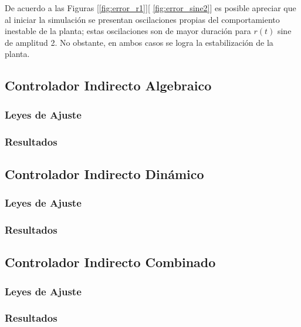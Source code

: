 De acuerdo a las Figuras [\ref{fig:error_r1}][ \ref{fig:error_sine2}] es posible apreciar que al iniciar la simulación se presentan oscilaciones propias del comportamiento inestable de la planta; estas oscilaciones son de mayor duración para $r(t)$ sine de amplitud 2. No obstante, en ambos casos se logra la estabilización de la planta.














\subsection{Controlador Indirecto Algebraico}
\subsubsection{Leyes de Ajuste }

\subsubsection{Resultados}


\subsection{Controlador Indirecto Dinámico}
\subsubsection{Leyes de Ajuste }

\subsubsection{Resultados}


\subsection{Controlador Indirecto Combinado}
\subsubsection{Leyes de Ajuste }

\subsubsection{Resultados}




